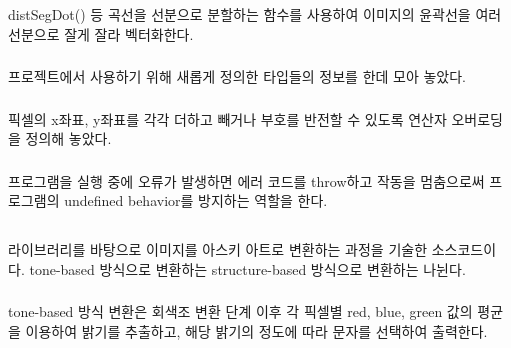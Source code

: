 \documentclass[conference]{IEEEtran}
\begin{document}
\subsubsection{\egTrace}

 distSegDot() 등 곡선을 선분으로 분할하는 함수를 사용하여 이미지의 윤곽선을 여러 선분으로 잘게 잘라 벡터화한다.

\subsubsection{\egTypes}

 프로젝트에서 사용하기 위해 새롭게 정의한 타입들의 정보를 한데 모아 놓았다.

\subsubsection{\egOperators}

 픽셀의 x좌표, y좌표를 각각 더하고 빼거나 부호를 반전할 수 있도록 연산자 오버로딩을 정의해 놓았다.

\subsubsection{\egExceptions}

 프로그램을 실행 중에 오류가 발생하면 에러 코드를 throw하고 작동을 멈춤으로써 프로그램의 undefined behavior를 방지하는 역할을 한다.

\subsection{\imgascii}

 \eg 라이브러리를 바탕으로 이미지를 아스키 아트로 변환하는 과정을 기술한 소스코드이다.
tone-based 방식으로 변환하는  structure-based 방식으로 변환하는  나뉜다.

\subsubsection{\tone}
tone-based 방식 변환은 회색조 변환 단계 이후 각 픽셀별 red, blue, green 값의 평균을 이용하여 밝기를 추출하고, 해당 밝기의 정도에 따라 문자를 선택하여 출력한다.

\subsubsection{\structure}
\end{document}
